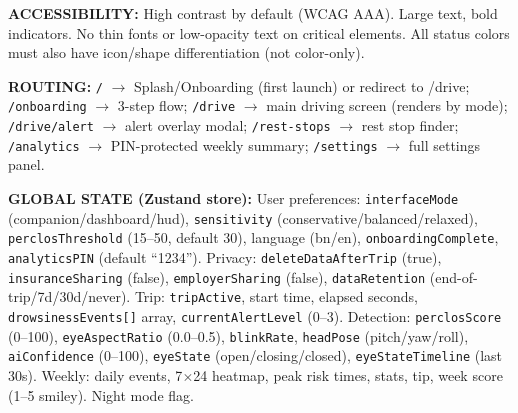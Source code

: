 \documentclass[sigconf]{acmart}
\begin{document}
\begin{promptbox}
\textbf{ACCESSIBILITY:} High contrast by default (WCAG AAA). Large text, bold indicators. No thin fonts or low-opacity text on critical elements. All status colors must also have icon/shape differentiation (not color-only).
 
\textbf{ROUTING:} \texttt{/} $\rightarrow$ Splash/Onboarding (first launch) or redirect to /drive; \texttt{/onboarding} $\rightarrow$ 3-step flow; \texttt{/drive} $\rightarrow$ main driving screen (renders by mode); \texttt{/drive/alert} $\rightarrow$ alert overlay modal; \texttt{/rest-stops} $\rightarrow$ rest stop finder; \texttt{/analytics} $\rightarrow$ PIN-protected weekly summary; \texttt{/settings} $\rightarrow$ full settings panel.
 
\textbf{GLOBAL STATE (Zustand store):} User preferences: \texttt{interfaceMode} (companion/dashboard/hud), \texttt{sensitivity} (conservative/balanced/relaxed), \texttt{perclosThreshold} (15--50, default 30), language (bn/en), \texttt{onboardingComplete}, \texttt{analyticsPIN} (default ``1234''). Privacy: \texttt{deleteDataAfterTrip} (true), \texttt{insuranceSharing} (false), \texttt{employerSharing} (false), \texttt{dataRetention} (end-of-trip/7d/30d/never). Trip: \texttt{tripActive}, start time, elapsed seconds, \texttt{drowsinessEvents[]} array, \texttt{currentAlertLevel} (0--3). Detection: \texttt{perclosScore} (0--100), \texttt{eyeAspectRatio} (0.0--0.5), \texttt{blinkRate}, \texttt{headPose} (pitch/yaw/roll), \texttt{aiConfidence} (0--100), \texttt{eyeState} (open/closing/closed), \texttt{eyeStateTimeline} (last 30s). Weekly: daily events, 7$\times$24 heatmap, peak risk times, stats, tip, week score (1--5 smiley). Night mode flag.
\end{promptbox}
 
\end{document}
